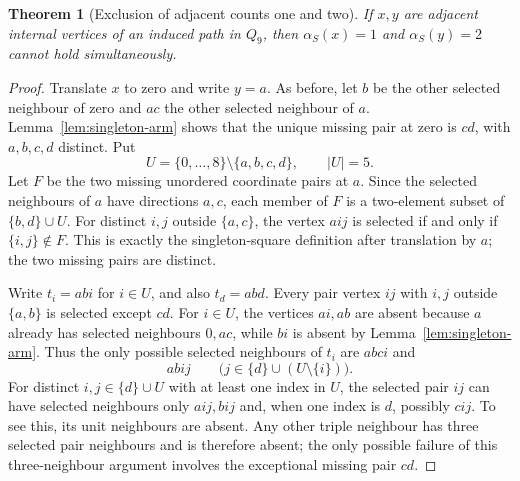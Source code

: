 \documentclass[11pt,a4paper]{article}
\newtheorem{theorem}{Theorem}[section]
\theoremstyle{definition}
\theoremstyle{remark}
\newcommand{\Q}{Q}
\begin{document}
\begin{theorem}[Exclusion of adjacent counts one and two]\label{thm:no-adjacent-one-two}
If $x,y$ are adjacent internal vertices of an induced path in $\Q_9$, then $\alpha_S(x)=1$ and $\alpha_S(y)=2$ cannot hold simultaneously.
\end{theorem}
\begin{proof}
Translate $x$ to zero and write $y=a$. As before, let $b$ be the other selected neighbour of zero and $ac$ the other selected neighbour of $a$. Lemma~\ref{lem:singleton-arm} shows that the unique missing pair at zero is $cd$, with $a,b,c,d$ distinct. Put
\[
U=\{0,\ldots,8\}\setminus\{a,b,c,d\},\qquad |U|=5.
\]
Let $F$ be the two missing unordered coordinate pairs at $a$. Since the selected neighbours of $a$ have directions $a,c$, each member of $F$ is a two-element subset of $\{b,d\}\cup U$. For distinct $i,j$ outside $\{a,c\}$, the vertex $aij$ is selected if and only if $\{i,j\}\notin F$. This is exactly the singleton-square definition after translation by $a$; the two missing pairs are distinct.

Write $t_i=abi$ for $i\in U$, and also $t_d=abd$. Every pair vertex $ij$ with $i,j$ outside $\{a,b\}$ is selected except $cd$. For $i\in U$, the vertices $ai,ab$ are absent because $a$ already has selected neighbours $0,ac$, while $bi$ is absent by Lemma~\ref{lem:singleton-arm}. Thus the only possible selected neighbours of $t_i$ are $abci$ and
\[
abij\qquad\bigl(j\in\{d\}\cup(U\setminus\{i\})\bigr).
\]
For distinct $i,j\in\{d\}\cup U$ with at least one index in $U$, the selected pair $ij$ can have selected neighbours only $aij,bij$ and, when one index is $d$, possibly $cij$. To see this, its unit neighbours are absent. Any other triple neighbour has three selected pair neighbours and is therefore absent; the only possible failure of this three-neighbour argument involves the exceptional missing pair $cd$.


\end{proof}
\end{document}
